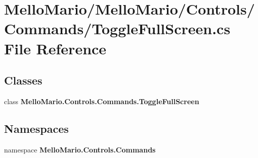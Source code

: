 \section{Mello\+Mario/\+Mello\+Mario/\+Controls/\+Commands/\+Toggle\+Full\+Screen.cs File Reference}
\label{ToggleFullScreen_8cs}
\subsection*{Classes}
\begin{DoxyCompactItemize}
\item 
class \textbf{ Mello\+Mario.\+Controls.\+Commands.\+Toggle\+Full\+Screen}
\end{DoxyCompactItemize}
\subsection*{Namespaces}
\begin{DoxyCompactItemize}
\item 
namespace \textbf{ Mello\+Mario.\+Controls.\+Commands}
\end{DoxyCompactItemize}
